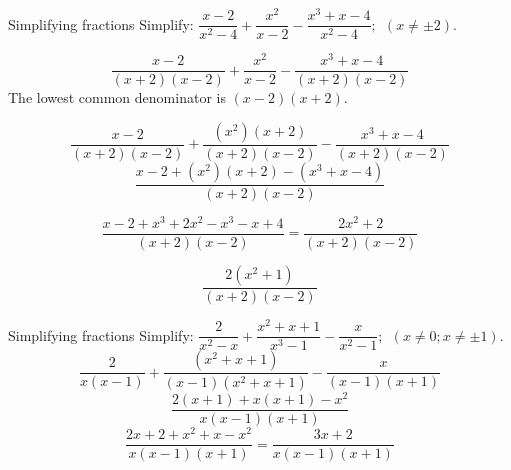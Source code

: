       
\begin{wex}{Simplifying fractions}
{Simplify: $\dfrac{x-2}{{x}^{2}-4}+\dfrac{{x}^{2}}{x-2}-\dfrac{{x}^{3}+x-4}{{x}^{2}-4}; ~~(x \neq \pm2)$.}
{
\begin{equation*}
\frac{x-2}{(x+2)(x-2)}+\frac{{x}^{2}}{x-2}-\frac{{x}^{3}+x-4}{(x+2)(x-2)}
\end{equation*}
 The lowest common denominator is $(x-2)(x+2)$. 

\begin{equation*}
\frac{x-2}{(x+2)(x-2)}+\frac{({x}^{2})
(x+2)}{(x+2)(x-2)}-\frac{{x}^{3}+x-4}{(x+2)(x-2)}
\end{equation*}
\begin{equation*}
\frac{x-2+({x}^{2})(x+2)-(x^{3}+x-4)}{(x+2)(x-2)}
\end{equation*}

\begin{equation*}
  \dfrac{x-2+{x}^{3}+ 2x^{2}-x^{3} - x+4}{(x+2)(x-2)} = \dfrac{2x^{2} + 2}{(x+2)(x-2)}
\end{equation*}

\begin{equation*}
\dfrac{2({x}^{2}
+1)}{(x+2)(x-2)}
\end{equation*}
}
\end{wex}

\begin{wex}{Simplifying fractions}
{Simplify: $\dfrac{2}{{x}^{2}-x}+\dfrac{x^{2}+x+1}{x^{3}-1}-\dfrac{x}{{x}^{2}-1}; ~~(x \neq 0;x \neq \pm1)$.}
{
\begin{equation*}
  \dfrac{2}{x(x-1)}+ \dfrac{({x}^{2} + x + 1)}{(x-1)(x^{2}+x+1)}-\dfrac{x}{(x-1)(x+1)}
\end{equation*}
\begin{equation*}
  \dfrac{2(x+1)+x(x+1)-x^{2}}{x(x-1)(x+1)}
\end{equation*}
\begin{equation*}
  \dfrac{2x+2 + x^{2} + x - x^{2}}{x(x-1)(x+1)} = \dfrac{3x+2}{x(x-1)(x+1)}
\end{equation*}
}
\end{wex}


